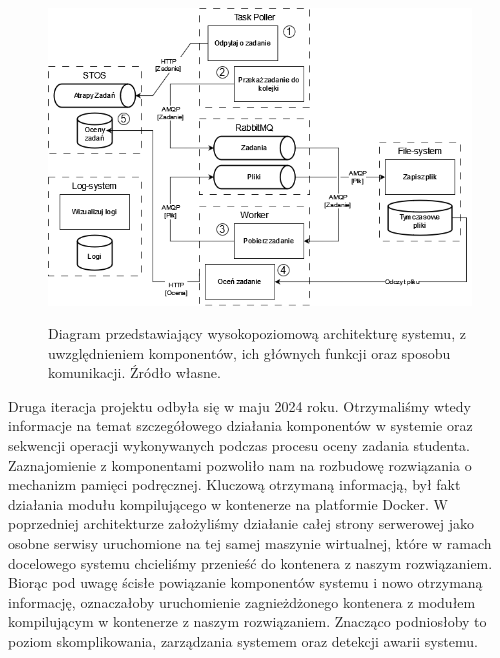\begin{figure}[!h]
	\begin{center}
		\resizebox{0.7\textwidth}{!} {
			\includegraphics{img/1/i1_arch.png}
		}
		\caption[Architektura po pierwszej iteracji]{Diagram przedstawiający wysokopoziomową architekturę systemu, z uwzględnieniem komponentów, ich głównych funkcji oraz sposobu komunikacji. Źródło własne.}
	\end{center}
\end{figure}
\indent Druga iteracja projektu odbyła się w maju 2024 roku. Otrzymaliśmy wtedy informacje na temat szczegółowego działania komponentów w systemie oraz sekwencji operacji wykonywanych podczas procesu oceny zadania studenta. Zaznajomienie z komponentami pozwoliło nam na rozbudowę rozwiązania o mechanizm pamięci podręcznej. Kluczową otrzymaną informacją, był fakt działania modułu kompilującego w kontenerze na platformie Docker. W poprzedniej architekturze założyliśmy działanie całej strony serwerowej jako osobne serwisy uruchomione na tej samej maszynie wirtualnej, które w ramach docelowego systemu chcieliśmy przenieść do kontenera z naszym rozwiązaniem. Biorąc pod uwagę ścisłe powiązanie komponentów systemu i nowo otrzymaną informację, oznaczałoby uruchomienie zagnieżdżonego kontenera z modułem kompilującym w kontenerze z naszym rozwiązaniem. Znacząco podniosłoby to poziom skomplikowania, zarządzania systemem oraz detekcji awarii systemu.
